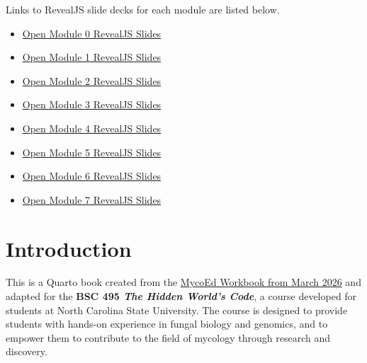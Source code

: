 \documentclass[
  letterpaper,
  DIV=11,
  numbers=noendperiod]{scrreprt}
\providecommand{\tightlist}{%
  \setlength{\itemsep}{0pt}\setlength{\parskip}{0pt}}
\begin{document}
\begin{tcolorbox}[enhanced jigsaw, arc=.35mm, bottomrule=.15mm, bottomtitle=1mm, breakable, colback=white, colbacktitle=quarto-callout-tip-color!10!white, colframe=quarto-callout-tip-color-frame, coltitle=black, left=2mm, leftrule=.75mm, opacityback=0, opacitybacktitle=0.6, rightrule=.15mm, title=\textcolor{quarto-callout-tip-color}{\faLightbulb}\hspace{0.5em}{Tip}, titlerule=0mm, toprule=.15mm, toptitle=1mm]

Links to RevealJS slide decks for each module are listed below.

\begin{itemize}
\tightlist
\item
  \href{module0-slides.html}{Open Module 0 RevealJS Slides}
\item
  \href{module1-slides.html}{Open Module 1 RevealJS Slides}
\item
  \href{module2-slides.html}{Open Module 2 RevealJS Slides}
\item
  \href{module3-slides.html}{Open Module 3 RevealJS Slides}
\item
  \href{module4-slides.html}{Open Module 4 RevealJS Slides}
\item
  \href{module5-slides.html}{Open Module 5 RevealJS Slides}
\item
  \href{module6-slides.html}{Open Module 6 RevealJS Slides}
\item
  \href{module7-slides.html}{Open Module 7 RevealJS Slides}
\end{itemize}

\end{tcolorbox}


\chapter*{Introduction}\label{introduction}


This is a Quarto book created from the
\href{https://dx.doi.org/10.17504/protocols.io.rm7vzqd5xvx1/v1}{MycoEd
Workbook from March 2026} and adapted for the \textbf{BSC 495 \emph{The
Hidden World's Code}}, a course developed for students at North Carolina
State University. The course is designed to provide students with
hands-on experience in fungal biology and genomics, and to empower them
to contribute to the field of mycology through research and discovery.
\end{document}
